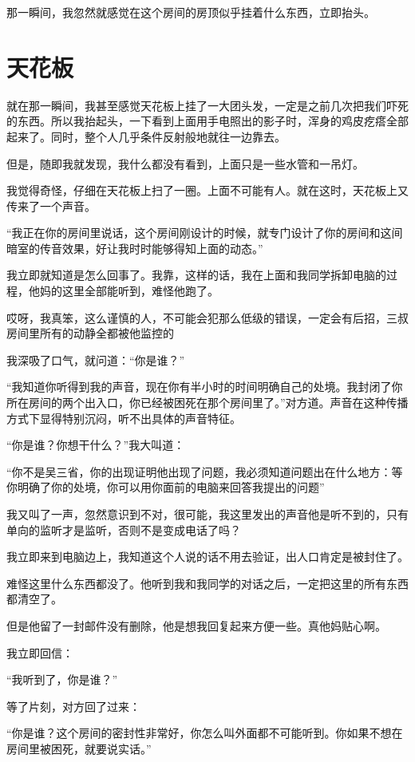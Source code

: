 那一瞬间，我忽然就感觉在这个房间的房顶似乎挂着什么东西，立即抬头。

\chapter{天花板}

就在那一瞬间，我甚至感觉天花板上挂了一大团头发，一定是之前几次把我们吓死的东西。所以我抬起头，一下看到上面用手电照出的影子时，浑身的鸡皮疙瘩全部起来了。同时，整个人几乎条件反射般地就往一边靠去。

但是，随即我就发现，我什么都没有看到，上面只是一些水管和一吊灯。

我觉得奇怪，仔细在天花板上扫了一圈。上面不可能有人。就在这时，天花板上又传来了一个声音。

“我正在你的房间里说话，这个房间刚设计的时候，就专门设计了你的房间和这间暗室的传音效果，好让我时时能够得知上面的动态。”

我立即就知道是怎么回事了。我靠，这样的话，我在上面和我同学拆卸电脑的过程，他妈的这里全部能听到，难怪他跑了。

哎呀，我真笨，这么谨慎的人，不可能会犯那么低级的错误，一定会有后招，三叔房间里所有的动静全都被他监控的

我深吸了口气，就问道：“你是谁？”

“我知道你听得到我的声音，现在你有半小时的时间明确自己的处境。我封闭了你所在房间的两个出入口，你已经被困死在那个房间里了。”对方道。声音在这种传播方式下显得特别沉闷，听不出具体的声音特征。

“你是谁？你想干什么？”我大叫道：

“你不是吴三省，你的出现证明他出现了问题，我必须知道问题出在什么地方：等你明确了你的处境，你可以用你面前的电脑来回答我提出的问题”

我又叫了一声，忽然意识到不对，很可能，我这里发出的声音他是听不到的，只有单向的监听才是监听，否则不是变成电话了吗？

我立即来到电脑边上，我知道这个人说的话不用去验证，出人口肯定是被封住了。

难怪这里什么东西都没了。他听到我和我同学的对话之后，一定把这里的所有东西都清空了。

但是他留了一封邮件没有删除，他是想我回复起来方便一些。真他妈贴心啊。

我立即回信：

“我听到了，你是谁？”

等了片刻，对方回了过来：

“你是谁？这个房间的密封性非常好，你怎么叫外面都不可能听到。你如果不想在房间里被困死，就要说实话。”

